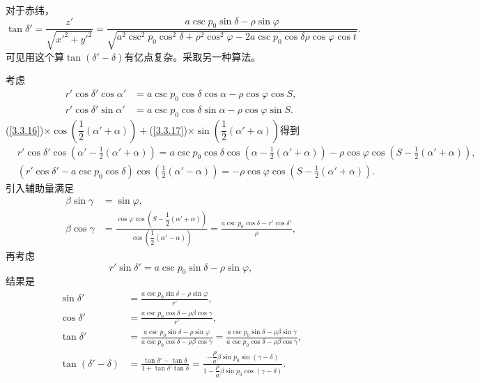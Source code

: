 \documentclass[11pt, a4paper, oneside]{ctexart}
\numberwithin{equation}{subsection}
\begin{document}
对于赤纬，
\begin{equation}
\tan\delta'=\frac{z'}{\sqrt{x'^2+y'^2}}=\frac{a\csc p_0\sin\delta-\rho\sin\varphi}{\sqrt{a^2\csc^2p_0\cos^2\delta+\rho^2\cos^2\varphi-2a\csc p_0\cos\delta\rho\cos\varphi\cos t}}.
\end{equation}
可见用这个算$\tan\left(\delta{}'-\delta{}\right)$有亿点复杂。采取另一种算法。

考虑
\begin{align}
r'\cos\delta'\cos\alpha'&=a\csc p_0\cos\delta\cos\alpha-\rho\cos\varphi\cos S,\label{3.3.16}\\
r'\cos\delta'\sin\alpha'&=a\csc p_0\cos\delta\sin\alpha-\rho\cos\varphi\sin S.\label{3.3.17}
\end{align}
(\ref{3.3.16})$\times\cos\left(\dfrac{1}{2}\left(\alpha'+\alpha\right)\right)+$(\ref{3.3.17})$\times\sin\left(\dfrac{1}{2}\left(\alpha'+\alpha\right)\right)$得到
\begin{align}
&r'\cos\delta'\cos\left(\alpha'-\frac12\left(\alpha'+\alpha\right)\right)=a\csc p_0\cos\delta\cos\left(\alpha-\frac12\left(\alpha'+\alpha\right)\right)-\rho\cos\varphi\cos\left(S-\frac12\left(\alpha'+\alpha\right)\right),\\
&\left(r'\cos\delta'-a\csc p_0\cos\delta\right)\cos\left(\frac12\left(\alpha'-\alpha\right)\right)=-\rho\cos\varphi\cos\left(S-\frac12\left(\alpha'+\alpha\right)\right).
\end{align}
引入辅助量满足
\begin{align}
\beta\sin\gamma&=\sin\varphi,\\
\beta\cos\gamma&=\frac{\cos\varphi\cos\left(S-\dfrac{1}{2}\left(\alpha'+\alpha\right)\right)}{\cos\left(\dfrac{1}{2}\left(\alpha'-\alpha\right)\right)}=\frac{a\csc p_0\cos\delta-r'\cos\delta'}{\rho},
\end{align}
再考虑
\begin{equation}
r'\sin\delta'=a\csc p_0\sin\delta-\rho\sin\varphi,
\end{equation}
结果是
\begin{align}
\sin\delta'&=\frac{a\csc p_0\sin\delta-\rho\sin\varphi}{r'},\\
\cos\delta'&=\frac{a\csc p_0\cos\delta-\rho\beta\cos\gamma}{r'},\\
\tan\delta'&=\frac{a\csc p_0\sin\delta-\rho\sin\varphi}{a\csc p_0\cos\delta-\rho\beta\cos\gamma}=\frac{a\csc p_0\sin\delta-\rho\beta\sin\gamma}{a\csc p_0\cos\delta-\rho\beta\cos\gamma},\\
\tan\left(\delta'-\delta\right)&=\frac{\tan\delta'-\tan\delta}{1+\tan\delta'\tan\delta}=\frac{-\dfrac\rho a\beta\sin p_0\sin\left(\gamma-\delta\right)}{1-\dfrac\rho a\beta\sin p_0\cos\left(\gamma-\delta\right)}.
\end{align}
\end{document}
